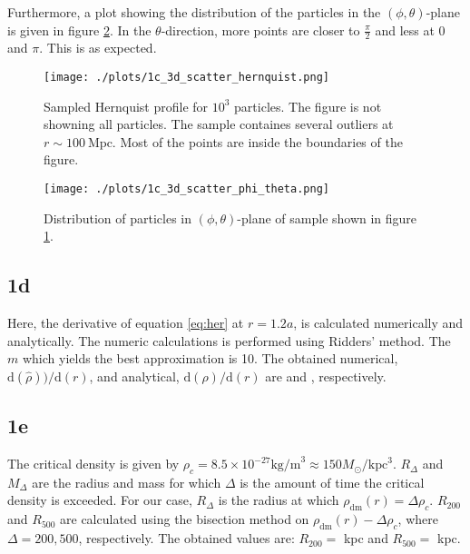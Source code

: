 Furthermore, a plot showing the distribution of the particles in the $(\phi,\theta)$-plane is given in figure \ref{fig:1c2}. In the $\theta$-direction, more points are closer to $\frac{\pi}{2}$ and less at $0$ and $\pi$. This is as expected.

\begin{figure}[!ht]
  \centering
  \texttt{[image: ./plots/1c\_3d\_scatter\_hernquist.png]}
  \caption{Sampled Hernquist profile for $10^3$ particles. The figure is not showning all particles. The sample containes several outliers at $r \sim 100\ \mathrm{Mpc}$. Most of the points are inside the boundaries of the figure.}
  \label{fig:1c1}
\end{figure}

\begin{figure}[!ht]
  \centering
  \texttt{[image: ./plots/1c\_3d\_scatter\_phi\_theta.png]}
  \caption{Distribution of particles in $(\phi,\theta)$-plane of sample shown in figure \ref{fig:1c1}.}
  \label{fig:1c2}
\end{figure}

\subsection*{1d}
Here, the derivative of equation \ref{eq:her} at $r=1.2a$, is calculated numerically and analytically. The numeric calculations is performed using Ridders' method. The $m$ which yields the best approximation is 10. The obtained numerical, $\mathrm{d}(\hat{\rho}))/\mathrm{d}(r)$, and analytical, $\mathrm{d}(\rho)/\mathrm{d}(r)$ are  and , respectively.

\subsection*{1e}
The critical density is given by $\rho_c = 8.5 \times 10^{-27} \mathrm{kg/m}^3 \approx 150 M_\odot/\mathrm{kpc}^3$. $R_\Delta$ and $M_\Delta$ are the radius and mass for which $\Delta$ is the amount of time the critical density is exceeded. For our case, $R_\Delta$ is the radius at which $\rho_\mathrm{dm}(r) = \Delta\rho_c$. $R_{200}$ and $R_{500}$ are calculated using the bisection method on $\rho_\mathrm{dm}(r) - \Delta\rho_c$, where $\Delta = 200, 500$, respectively. The obtained values are: $R_{200} = $ kpc and $R_{500} = $ kpc.

